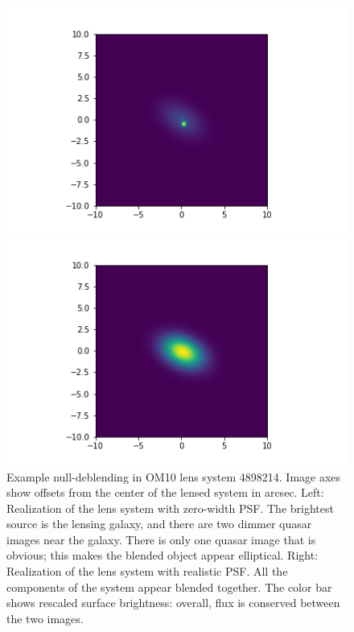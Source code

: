 \documentclass[\docopts]{\docclass}
\begin{document}
\begin{figure}
    \centering
    \begin{minipage}{0.48\linewidth}
        \centering
        \includegraphics[width=\linewidth]{beforenulldeblend.png}
    \end{minipage}\hfill
    \begin{minipage}{0.48\linewidth}
        \centering
        \includegraphics[width=\linewidth]{afternulldeblend.png}
    \end{minipage}
    \caption{Example null-deblending in OM10 lens system 4898214. Image
    axes show offsets from the  center of the lensed system in arcsec.
    Left: Realization of the lens system with zero-width PSF. The
    brightest source is the lensing galaxy, and there are two dimmer
    quasar images near the galaxy. There is only one quasar image that
    is obvious; this makes the blended object appear elliptical. Right:
    Realization of the lens system with realistic PSF. All the
    components of the system appear blended together. The color bar
    shows rescaled surface brightness: overall, flux is conserved
    between the two images.}
    \label{fig:null-deblend}
\end{figure}
\end{document}
